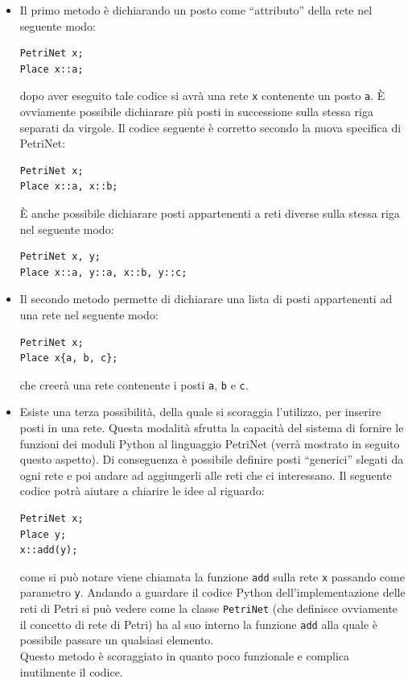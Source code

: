 \documentclass[italian,12pt]{book}
\begin{document}
\begin{itemize}

\item Il primo metodo è dichiarando un posto come ``attributo'' della rete nel seguente modo:
\begin{verbatim}PetriNet x;
Place x::a;
\end{verbatim}
dopo aver eseguito tale codice si avrà una rete {\tt x} contenente un posto {\tt a}.
È ovviamente possibile dichiarare più posti in successione sulla stessa riga separati da 
virgole. Il codice seguente è corretto secondo la nuova specifica di PetriNet:
\begin{verbatim}PetriNet x;
Place x::a, x::b;
\end{verbatim}
È anche possibile dichiarare posti appartenenti a reti diverse sulla stessa riga nel seguente modo:
\begin{verbatim}PetriNet x, y;
Place x::a, y::a, x::b, y::c;
\end{verbatim}

\item Il secondo metodo permette di dichiarare una lista di posti appartenenti ad una rete nel seguente modo:
\begin{verbatim}PetriNet x;
Place x{a, b, c};
\end{verbatim}
che creerà una rete contenente i posti {\tt a}, {\tt b} e {\tt c}.

\item Esiste una terza possibilità, della quale si scoraggia l'utilizzo, per inserire posti in una rete.
Questa modalità sfrutta la capacità del sistema di fornire le funzioni dei moduli Python al linguaggio PetriNet
(verrà mostrato in seguito questo aspetto). Di conseguenza è possibile definire posti ``generici'' slegati da 
ogni rete e poi andare ad aggiungerli alle reti che ci interessano. Il seguente codice potrà aiutare a chiarire
le idee al riguardo:
\begin{verbatim}PetriNet x;
Place y;
x::add(y);
\end{verbatim}
come si può notare viene chiamata la funzione {\tt add} sulla rete {\tt x} passando come parametro {\tt y}.
Andando a guardare il codice Python dell'implementazione delle reti di Petri si può vedere come la classe 
{\tt PetriNet} (che definisce ovviamente il concetto di rete di Petri) ha al suo interno la funzione {\tt add}
alla quale è possibile passare un qualsiasi elemento.\\
Questo metodo è scoraggiato in quanto poco funzionale e complica inutilmente il codice.
\end{itemize}
\end{document}
